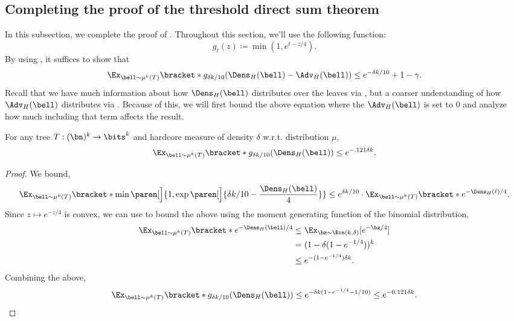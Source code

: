 \subsection{Completing the proof of the threshold direct sum theorem}
\label{subsec:threshold-DPT-proof}
In this subsection, we complete the proof of . Throughout this section, we'll use the following function:
\begin{equation*}
    g_t(z) \coloneqq \min(1, e^{t - z/4}).
\end{equation*}
By using , it suffices to show that
\begin{equation}
    \label{eq:error-bound}
     \Ex_{\bell \sim \mu^k(T)}\bracket*{g_{\delta k/10}(\Dens_H(\bell) - \Adv_H(\bell))}  \leq e^{-\delta k/10} + 1-\gamma.
\end{equation}
Recall that we have much information about how $\Dens_H(\bell)$ distributes over the leaves via , but a coarser understanding of how $\Adv_H(\bell)$ distributes via . Because of this, we will first bound the above equation where the $\Adv_H(\bell)$ is set to $0$ and analyze how much including that term affects the result.
\begin{lemma}
    \label{lem:error-no-advantange}
    For any tree $T:(\bn)^k \to \bits^k$ and hardcore measure of density $\delta$ w.r.t. distribution $\mu$,
    \begin{equation*}
        \Ex_{\bell \sim \mu^k(T)}\bracket*{g_{\delta k/10}(\Dens_H(\bell))} \leq e^{-.121\delta k}.
    \end{equation*}
\end{lemma}
\begin{proof}
    We bound,
    \begin{equation*}
        \Ex_{\bell \sim \mu^k(T)}\bracket*{\min\paren[\Big]{1, \exp\paren[\Big]{\delta k / 10 - \frac{\Dens_H(\bell)}{4}}}} \leq e^{\delta k/10} \cdot \Ex_{\bell \sim \mu^k(T)}\bracket*{e^{-\Dens_H(\ell)/4}}.
    \end{equation*}
    Since $z \mapsto e^{-z/4}$ is convex, we can use  to bound the above using the moment generating function of the binomial distribution,
    \begin{align*}
         \Ex_{\bell \sim \mu^k(T)}\bracket*{e^{-\Dens_H(\bell)/4}} &\leq \Ex_{\bz \sim \Bin(k,\delta)}[e^{-\bz/4}] \\
         &= (1 - \delta(1 - e^{-1/4}))^k \\
         & \leq e^{-(1 -e^{-1/4})\delta k}.
    \end{align*}
    Combining the above,
    \begin{equation*}
         \Ex_{\bell \sim \mu^k(T)}\bracket*{g_{\delta k/10}(\Dens_H(\bell))}  \leq e^{-\delta k (1 - e^{-1/4} - 1/10)} \leq e^{-0.121 \delta k}. \qedhere
    \end{equation*}
\end{proof}
